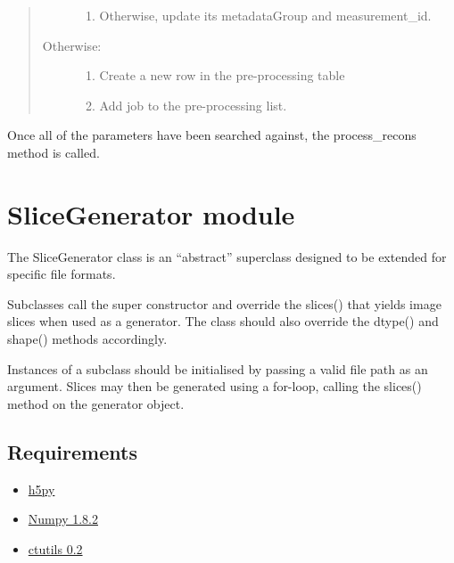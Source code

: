 \documentclass[letterpaper,10pt,english]{sphinxmanual}
\begin{document}
\begin{fulllineitems}
\begin{fulllineitems}
\begin{quote}
\begin{description}
\begin{enumerate}
\item {} 
Otherwise, update its metadataGroup and measurement\_id.

\end{enumerate}

\item[{Otherwise:}] \leavevmode\begin{enumerate}
\item {} 
Create a new row in the pre-processing table

\item {} 
Add job to the pre-processing list.

\end{enumerate}

\end{description}
\end{quote}

Once all of the parameters have been searched against, the process\_recons method is called.

\end{fulllineitems}


\end{fulllineitems}



\chapter{SliceGenerator module}
\label{SliceGenerator:module-SliceGenerator}\label{SliceGenerator:slicegenerator-module}\label{SliceGenerator::doc}
The SliceGenerator class is an ``abstract'' superclass designed to be extended for specific file formats.

Subclasses call the super constructor and override the slices() that yields image slices when used as a generator. The
class should also override the dtype() and shape() methods accordingly.

Instances of a subclass should be initialised by passing a valid file path as an argument. Slices may then be generated
using a for-loop, calling the slices() method on the generator object.


\section{Requirements}
\label{SliceGenerator:requirements}\begin{itemize}
\item {} 
\href{http://www.h5py.org/}{h5py}

\item {} 
\href{http://www.numpy.org}{Numpy 1.8.2}

\item {} 
\href{https://github.com/waveform80/ctutils}{ctutils 0.2}

\end{itemize}
\end{document}
